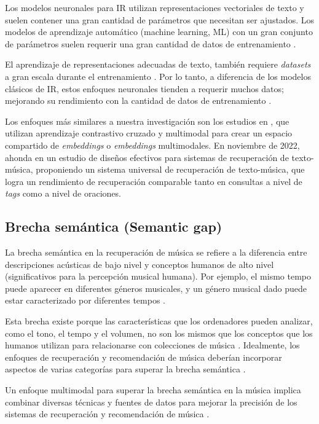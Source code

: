 Los modelos neuronales para IR utilizan representaciones vectoriales de texto y suelen contener una gran cantidad de parámetros que necesitan ser ajustados. Los modelos de aprendizaje automático (machine learning, ML) con un gran conjunto de parámetros suelen requerir una gran cantidad de datos de entrenamiento \cite{Taylor2006OptimisationMF}.

El aprendizaje de representaciones adecuadas de texto, también requiere \textit{datasets} a gran escala durante el entrenamiento \cite{Mitra2016LearningTM}. Por lo tanto, a diferencia de los modelos clásicos de IR, estos enfoques neuronales tienden a requerir muchos datos; mejorando su rendimiento con la cantidad de datos de entrenamiento \cite{Mitra2017NeuralMF}.

Los enfoques más similares a nuestra investigación son los estudios en \cite{Manco2022ContrastiveAL, Huang2022MuLanAJ}, que utilizan aprendizaje contrastivo cruzado y multimodal para crear un espacio compartido de \textit{embeddings} o \textit{embeddings} multimodales. En noviembre de 2022, \cite{Doh2022TowardUT} ahonda en un estudio de diseños efectivos para sistemas de recuperación de texto-música, proponiendo un sistema universal de recuperación de texto-música, que logra un rendimiento de recuperación comparable tanto en consultas a nivel de \textit{tags} como a nivel de oraciones.
\subsection{Brecha semántica (Semantic gap)}
\label{subsec:semantic-gap}
La brecha semántica en la recuperación de música se refiere a la diferencia entre descripciones acústicas de bajo nivel y conceptos humanos de alto nivel (significativos para la percepción musical humana). Por ejemplo, el mismo tempo puede aparecer en diferentes géneros musicales, y un género musical dado puede estar caracterizado por diferentes tempos \cite{Su2022HighperformanceCM}.

Esta brecha existe porque las características que los ordenadores pueden analizar, como el tono, el tempo y el volumen, no son los mismos que los conceptos que los humanos utilizan para relacionarse con colecciones de música \cite{Celma2006BridgingTM}. Idealmente, los enfoques de recuperación y recomendación de música deberían incorporar aspectos de varias categorías para superar la brecha semántica \cite{Schedl2014MusicIR}.

Un enfoque multimodal para superar la brecha semántica en la música implica combinar diversas técnicas y fuentes de datos para mejorar la precisión de los sistemas de recuperación y recomendación de música \cite{Celma2006AMA}.
